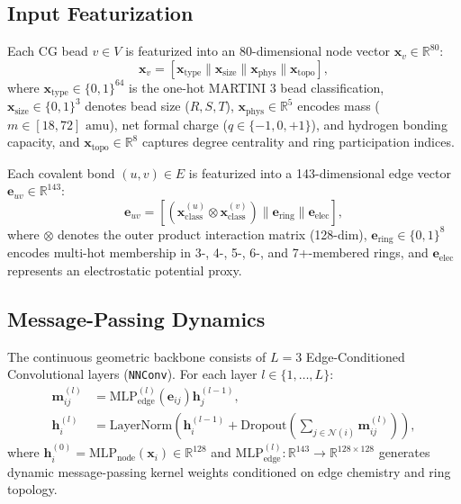 \documentclass[11pt,a4paper]{article}
\begin{document}
\subsection{Input Featurization}
Each CG bead $v \in V$ is featurized into an 80-dimensional node vector $\mathbf{x}_v \in \mathbb{R}^{80}$:
\begin{equation}
\mathbf{x}_v = \left[ \mathbf{x}_{\text{type}} \parallel \mathbf{x}_{\text{size}} \parallel \mathbf{x}_{\text{phys}} \parallel \mathbf{x}_{\text{topo}} \right],
\end{equation}
where $\mathbf{x}_{\text{type}} \in \{0, 1\}^{64}$ is the one-hot MARTINI 3 bead classification, $\mathbf{x}_{\text{size}} \in \{0, 1\}^3$ denotes bead size ($R, S, T$), $\mathbf{x}_{\text{phys}} \in \mathbb{R}^5$ encodes mass ($m \in [18, 72]\text{ amu}$), net formal charge ($q \in \{-1, 0, +1\}$), and hydrogen bonding capacity, and $\mathbf{x}_{\text{topo}} \in \mathbb{R}^8$ captures degree centrality and ring participation indices.

Each covalent bond $(u, v) \in E$ is featurized into a 143-dimensional edge vector $\mathbf{e}_{uv} \in \mathbb{R}^{143}$:
\begin{equation}
\mathbf{e}_{uv} = \left[ (\mathbf{x}_{\text{class}}^{(u)} \otimes \mathbf{x}_{\text{class}}^{(v)}) \parallel \mathbf{e}_{\text{ring}} \parallel \mathbf{e}_{\text{elec}} \right],
\end{equation}
where $\otimes$ denotes the outer product interaction matrix (128-dim), $\mathbf{e}_{\text{ring}} \in \{0, 1\}^8$ encodes multi-hot membership in 3-, 4-, 5-, 6-, and 7+-membered rings, and $\mathbf{e}_{\text{elec}}$ represents an electrostatic potential proxy.

\subsection{Message-Passing Dynamics}
The continuous geometric backbone consists of $L = 3$ Edge-Conditioned Convolutional layers (\texttt{NNConv}). For each layer $l \in \{1, \dots, L\}$:
\begin{align}
\mathbf{m}_{ij}^{(l)} &= \text{MLP}_{\text{edge}}^{(l)}(\mathbf{e}_{ij}) \mathbf{h}_j^{(l-1)}, \label{eq:msg}\\
\mathbf{h}_i^{(l)} &= \text{LayerNorm}\left( \mathbf{h}_i^{(l-1)} + \text{Dropout}\left(\sum_{j \in \mathcal{N}(i)} \mathbf{m}_{ij}^{(l)}\right) \right), \label{eq:update}
\end{align}
where $\mathbf{h}_i^{(0)} = \text{MLP}_{\text{node}}(\mathbf{x}_i) \in \mathbb{R}^{128}$ and $\text{MLP}_{\text{edge}}^{(l)}: \mathbb{R}^{143} \to \mathbb{R}^{128 \times 128}$ generates dynamic message-passing kernel weights conditioned on edge chemistry and ring topology.
\end{document}

